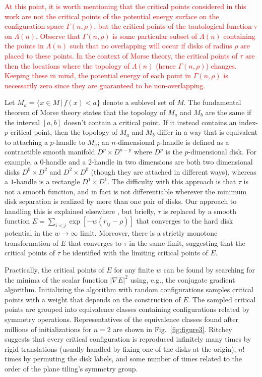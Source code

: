 \documentclass[default,iicol]{sn-jnl}%
\theoremstyle{thmstyleone}%
\theoremstyle{thmstyletwo}%
\theoremstyle{thmstylethree}%
\providecommand{\red}[1]{\textcolor{red}{#1}}
\begin{document}
\red{At this point, it is worth mentioning that the critical points considered in this work are not the critical points of the potential energy surface on the configuration space $\Gamma(n,\rho)$, but the critical points of the tautological function $\tau$ on $\Lambda(n)$. Observe that $\Gamma(n,\rho)$ is some particular subset of $\Lambda(n)$ containing the points in $\Lambda(n)$ such that no overlapping will occur if disks of radius $\rho$ are placed to these points. In the context of Morse theory, the critical points of $\tau$ are then the locations where the topology of $\Lambda(n)$ (hence $\Gamma(n,\rho)$) changes. Keeping these in mind, the potential energy of each point in $\Gamma(n,\rho)$ is necessarily zero since they are guaranteed to be non-overlapping.}

Let $M_a = \{x \in M \,\vert\, f(x) < a\}$ denote a sublevel set of $M$. The fundamental theorem of Morse theory states that the topology of $M_a$ and $M_b$ are the same if the interval $[a, b]$ doesn't contain a critical point. If it instead contains an index-$p$ critical point, then the topology of $M_a$ and $M_b$ differ in a way that is equivalent to attaching a $p$-handle to $M_a$; an $n$-dimensional $p$-handle is defined as a contractible smooth manifold $D^{p} \times D^{n-p}$ where $D^p$ is the $p$-dimensional disk. For example, a $0$-handle and a $2$-handle in two dimensions are both two dimensional disks $D^0 \times D^2$ and $D^2 \times D^0$ (though they are attached in different ways), whereas a $1$-handle is a rectangle $D^1 \times D^1$. The difficulty with this approach is that $\tau$ is not a smooth function, and in fact is not differentiable wherever the minimum disk separation is realized by more than one pair of disks. Our approach to handling this is explained elsewhere \cite{ritcheyphd}, but briefly, $\tau$ is replaced by a smooth function $E = \sum_{i < j} \exp[-w(r_{ij} - \rho)]$ that converges to the hard disk potential in the $w \rightarrow \infty$ limit. Moreover, there is a strictly monotone transformation of $E$ that converges to $\tau$ in the same limit, suggesting that the critical points of $\tau$ be identified with the limiting critical points of $E$.

Practically, the critical points of $E$ for any finite $w$ can be found by searching for the minima of the scalar function $\lvert\nabla E\rvert^2$ using, e.g., the conjugate gradient algorithm. Initializing the algorithm with random configurations samples critical points with a weight that depends on the construction of $E$. The sampled critical points are grouped into equivalence classes containing configurations related by symmetry operations. Representatives of the equivalence classes found after millions of initializations for $n = 2$ are shown in Fig.\ \ref{fig:figure3}. Ritchey \cite{ritcheyphd} suggests that every critical configuration is reproduced infinitely many times by rigid translations (usually handled by fixing one of the disks at the origin), $n!$ times by permuting the disk labels, and some number of times related to the order of the plane tiling's symmetry group.
\end{document}
